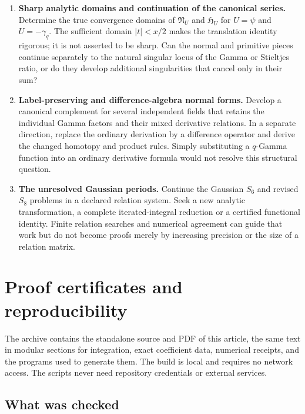 \documentclass[11pt,a4paper]{article}
\theoremstyle{definition}
\theoremstyle{remark}
\numberwithin{equation}{section}
\begin{document}
\begin{enumerate}[label=\textbf{Q\arabic*.},leftmargin=*]
\item \textbf{Sharp analytic domains and continuation of the canonical series.}
Determine the true convergence domains of $\mathfrak N_U$ and
$\mathfrak H_U$ for $U=\psi$ and $U=-\gamma_q$.
The sufficient domain $|t|<x/2$ makes the translation identity
rigorous; it is not asserted to be sharp. Can the normal and
primitive pieces continue separately to the natural singular locus
of the Gamma or Stieltjes ratio, or do they develop additional
singularities that cancel only in their sum?

\item \textbf{Label-preserving and difference-algebra normal forms.}
Develop a canonical complement for several independent fields that
retains the individual Gamma factors and their mixed derivative
relations. In a separate direction, replace the ordinary derivation
by a difference operator and derive the changed homotopy and product
rules. Simply substituting a $q$-Gamma function into an ordinary
derivative formula would not resolve this structural question.

\item \textbf{The unresolved Gaussian periods.}
Continue the Gaussian $S_6$ and revised $S_8$ problems in a declared
relation system. Seek a new analytic transformation, a complete
iterated-integral reduction or a certified functional identity.
Finite relation searches and numerical agreement can guide that
work but do not become proofs merely by increasing precision or
the size of a relation matrix.
\end{enumerate}

\section{Proof certificates and reproducibility}
\label{repro:section}

The archive contains the standalone source and PDF of this article,
the same text in modular sections for integration, exact coefficient
data, numerical receipts, and the programs used to generate them.
The build is local and requires no network access. The scripts never
need repository credentials or external services.

\subsection{What was checked}
\end{document}
